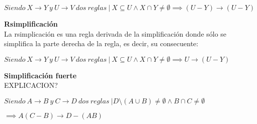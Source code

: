 \begin{center}
    \(Siendo \ X \to Y \ y \ U\to V \ dos \ reglas \ | \ X \subseteq U \wedge X \cap Y \neq \emptyset \implies (U - Y) \to (U - Y)\)
\end{center}


\bigskip
\textbf{Rsimplificaci\'on}\\
La rsimplicaci\'on es una regla derivada de la simplificaci\'on donde s\'olo se simplifica la parte derecha de la regla, es decir, su consecuente:

\begin{center}
    \(Siendo \ X \to Y \ y \ U\to V \ dos \ reglas \ | \ X \subseteq U \wedge X \cap Y \neq \emptyset \implies U \to (U - Y)\)
\end{center}


\bigskip

% 
\textbf{Simplificaci\'on fuerte}\\

EXPLICACION?

\begin{center}
    \(Siendo \ A \to B \ y \ C\to D \ dos \ reglas \ | D \setminus (A \cup B) \neq \emptyset \wedge B \cap C \neq \emptyset\)
\end{center}

\begin{center}
    \(\implies A(C-B) \to D - (AB)\)
\end{center}



